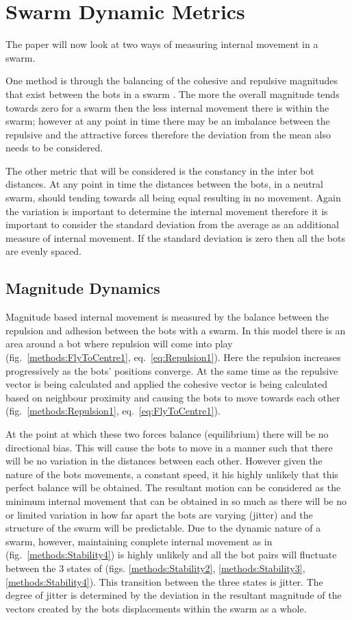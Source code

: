 \documentclass[10pt,journal,letterpaper,twoside]{IEEEtran}
\newcommand{\stability}{internal movement}
\newcommand{\Fig}{fig.}
\newcommand{\Figs}{figs.}
\newcommand{\Eq}{eq.}
\begin{document}
\section{Swarm Dynamic Metrics\label{methods:SwarmStability}}
The paper will now look at two ways of measuring \stability{} in a swarm.

One method is through the balancing of the cohesive and repulsive
magnitudes that exist between the bots in a swarm \cite{VGKP11}
\cite{LBMFKV07}. The more the overall magnitude tends towards zero for
a swarm then the less \stability{} there is within the swarm; however
at any point in time there may be an imbalance between the repulsive
and the attractive forces therefore the deviation from the mean also
needs to be considered.

The other metric that will be considered is the constancy in the inter
bot distances. At any point in time the distances between the bots, in
a neutral swarm, should tending towards all being equal resulting in
no movement. Again the variation is important to determine the
\stability{} therefore it is important to consider the standard
deviation from the average as an additional measure of
\stability{}. If the standard deviation is zero then all the bots are
evenly spaced.

\subsection{Magnitude Dynamics}

Magnitude based \stability{} is measured by the balance between the
repulsion and adhesion between the bots with a swarm. In this model
there is an area around a bot where repulsion will come into play
(\Fig{}~\ref{methods:FlyToCentre1}, \Eq{}~\ref{eq:Repulsion1}).  Here
the repulsion increases progressively as the bots' positions
converge. At the same time as the repulsive vector is being calculated
and applied the cohesive vector is being calculated based on neighbour
proximity and causing the bots to move towards each other
(\Fig{}~\ref{methods:Repulsion1}, \Eq{}~\ref{eq:FlyToCentre1}).

At the point at which these two forces balance (equilibrium) there
will be no directional bias. This will cause the bots to move in a
manner such that there will be no variation in the distances between
each other. However given the nature of the bots movements, a constant
speed, it his highly unlikely that this perfect balance will be
obtained. The resultant motion can be considered as the minimum
\stability{} that can be obtained in so much as there will be no or
limited variation in how far apart the bots are varying (jitter) and
the structure of the swarm will be predictable. Due to the dynamic
nature of a swarm, however, maintaining complete \stability{} as in
(\Fig{}~\ref{methods:Stability4}) is highly unlikely and all the bot
pairs will fluctuate between the 3 states of (\Figs{}
\ref{methods:Stability2}, \ref{methods:Stability3},
\ref{methods:Stability4}).  This transition between the three states
is jitter. The degree of jitter is determined by the deviation in the
resultant magnitude of the vectors created by the bots displacements
within the swarm as a whole.
\end{document}
